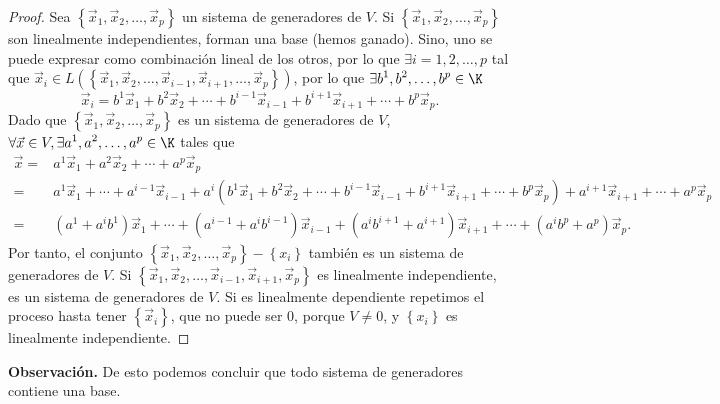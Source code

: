 \begin{proof}
	Sea $\displaystyle \left\{ \vec{x}_{1}, \vec{x}_{2}, \ldots, \vec{x}_{p}\right\}  $ un sistema de generadores de $\displaystyle V $. Si $\displaystyle \left\{ \vec{x}_{1}, \vec{x}_{2}, \ldots, \vec{x}_{p}\right\} $ son linealmente independientes, forman una base (hemos ganado). Sino, uno se puede expresar como combinación lineal de los otros, por lo que $\displaystyle \exists i = 1, 2, \ldots, p $ tal que $\displaystyle \vec{x}_{i} \in L \left(\left\{ \vec{x}_{1}, \vec{x}_{2}, \ldots, \vec{x}_{i-1}, \vec{x}_{i+1}, \ldots, \vec{x}_{p}\right\}\right) $, por lo que $\displaystyle \exists b^{1}, b^{2}, \ldots, b^{p} \in \K $ 
	\[\vec{x}_{i} = b^{1}\vec{x}_{1} + b^{2}\vec{x}_{2} + \cdots + b^{i-1}\vec{x}_{i-1} +b^{i+1}\vec{x}_{i+1} + \cdots + b^{p}\vec{x}_{p}  .\]
Dado que $\displaystyle \left\{ \vec{x}_{1}, \vec{x}_{2}, \ldots, \vec{x}_{p}\right\} $ es un sistema de generadores de $\displaystyle V $, $\displaystyle \forall \vec{x}\in V, \exists a^{1}, a^{2}, \ldots, a^{p} \in \K $ tales que 
\[
\begin{split}
	\vec{x}  = & a^{1}\vec{x}_{1} + a^{2}\vec{x}_{2} + \cdots + a^{p}\vec{x}_{p}  \\
	= & a^{1}\vec{x}_{1} + \cdots + a^{i-1}\vec{x}_{i-1} + a^{i} \left(b^{1}\vec{x}_{1} + b^{2}\vec{x}_{2} + \cdots + b^{i-1}\vec{x}_{i-1} +b^{i+1}\vec{x}_{i+1} + \cdots + b^{p}\vec{x}_{p}\right)+a^{i+1}\vec{x}_{i+1} + \cdots + a^{p}\vec{x}_{p} \\
	= & \left(a^{1} + a^{i}b^{1}\right) \vec{x}_{1} + \cdots + \left(a^{i-1} + a^{i}b^{i-1}\right) \vec{x}_{i-1} + \left(a^{i}b^{i+1}+a^{i+1}\right)\vec{x}_{i+1}+\cdots+\left(a^{i}b^{p}+a^{p}\right)\vec{x}_{p}.
\end{split}
\]
Por tanto, el conjunto $\displaystyle \left\{ \vec{x}_{1}, \vec{x}_{2}, \ldots, \vec{x}_{p}\right\}- \left\{ x_{i}\right\}  $ también es un sistema de generadores de $\displaystyle V $. Si $\displaystyle \left\{ \vec{x}_{1}, \vec{x}_{2}, \ldots, \vec{x}_{i-1}, \vec{x}_{i+1}, \vec{x}_{p}\right\}  $ es linealmente independiente, es un sistema de generadores de $\displaystyle V $. Si es linealmente dependiente repetimos el proceso hasta tener $\displaystyle \left\{ \vec{x}_{i}\right\}  $, que no puede ser 0, porque $\displaystyle V \neq 0 $, y $\displaystyle \left\{ x_{i}\right\}  $ es linealmente independiente.
\end{proof}

\textbf{Observación.} De esto podemos concluir que todo sistema de generadores contiene una base.

